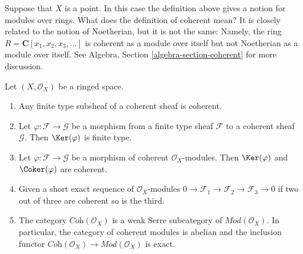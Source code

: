 \begin{example}
\label{example-coherent-not-Noetherian}
Suppose that $X$ is a point. In this case the definition
above gives a notion for modules over rings.
What does the definition of coherent mean?
It is closely related to the notion of Noetherian,
but it is not the same: Namely, the ring
$R = \mathbf{C}[x_1, x_2, x_3, \ldots]$ is coherent
as a module over itself but not Noetherian as a module
over itself. See Algebra, Section \ref{algebra-section-coherent}
for more discussion.
\end{example}

\begin{lemma}
\label{lemma-coherent-abelian}
Let $(X, \mathcal{O}_X)$ be a ringed space.
\begin{enumerate}
\item Any finite type subsheaf of a coherent sheaf is coherent.
\item Let $\varphi : \mathcal{F} \to \mathcal{G}$
be a morphism from a finite type sheaf $\mathcal{F}$
to a coherent sheaf $\mathcal{G}$. Then $\Ker(\varphi)$ is finite type.
\item Let $\varphi : \mathcal{F} \to \mathcal{G}$ be a morphism
of coherent $\mathcal{O}_X$-modules. Then
$\Ker(\varphi)$ and
$\Coker(\varphi)$ are coherent.
\item Given a short exact sequence of $\mathcal{O}_X$-modules
$0 \to \mathcal{F}_1 \to \mathcal{F}_2 \to \mathcal{F}_3 \to 0$
if two out of three are coherent so is the third.
\item The category $\textit{Coh}(\mathcal{O}_X)$ is a weak Serre subcategory
of $\textit{Mod}(\mathcal{O}_X)$. In particular, the category of
coherent modules is abelian and the inclusion functor
$\textit{Coh}(\mathcal{O}_X) \to \textit{Mod}(\mathcal{O}_X)$
is exact.
\end{enumerate}
\end{lemma}

